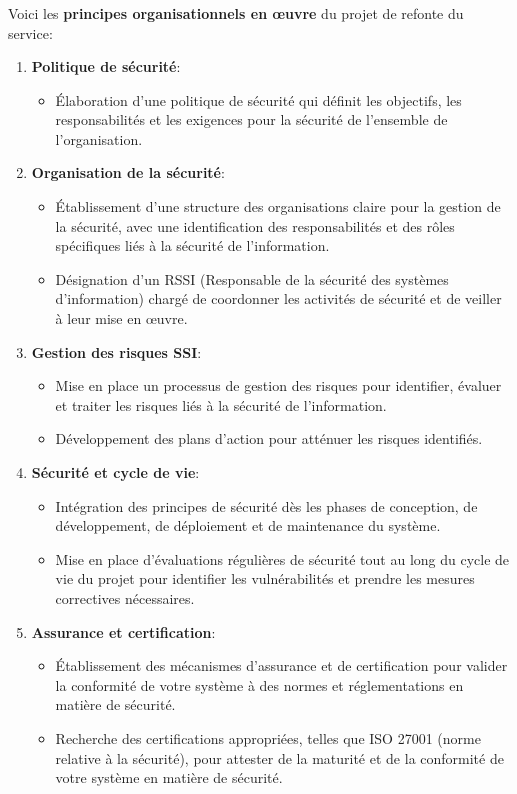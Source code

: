 \documentclass[a4paper, 11pt]{report}
\begin{document}
  \subsubsection{}
  Voici les \textbf{principes organisationnels en œuvre} du projet de refonte du service:
  \begin{enumerate}
    \item \textbf{Politique de sécurité}:
      \begin{itemize}
        \item Élaboration d'une politique de sécurité qui définit les objectifs, les responsabilités et les exigences pour la sécurité de l'ensemble de l'organisation.
      \end{itemize}
    \item \textbf{Organisation de la sécurité}:
      \begin{itemize}
        \item Établissement d'une structure des organisations claire pour la gestion de la sécurité, avec une identification des responsabilités et des rôles spécifiques liés à la sécurité de l'information.
        \item Désignation d'un RSSI (Responsable de la sécurité des systèmes d'information) chargé de coordonner les activités de sécurité et de veiller à leur mise en œuvre.
      \end{itemize}
    \item \textbf{Gestion des risques SSI}:
      \begin{itemize}
        \item Mise en place un processus de gestion des risques pour identifier, évaluer et traiter les risques liés à la sécurité de l'information.
        \item Développement des plans d'action pour atténuer les risques identifiés.
      \end{itemize}
    \item \textbf{Sécurité et cycle de vie}:
      \begin{itemize}
        \item Intégration des principes de sécurité dès les phases de conception, de développement, de déploiement et de maintenance du système.
        \item Mise en place d'évaluations régulières de sécurité tout au long du cycle de vie du projet pour identifier les vulnérabilités et prendre les mesures correctives nécessaires.
      \end{itemize}
    \item \textbf{Assurance et certification}:
      \begin{itemize}
        \item Établissement des mécanismes d'assurance et de certification pour valider la conformité de votre système à des  normes et réglementations en matière de sécurité.
        \item Recherche des certifications appropriées, telles que ISO 27001 (norme relative à la sécurité), pour attester de la maturité et de la conformité de votre système en matière de sécurité.
      \end{itemize}
  \end{enumerate}
\end{document}
